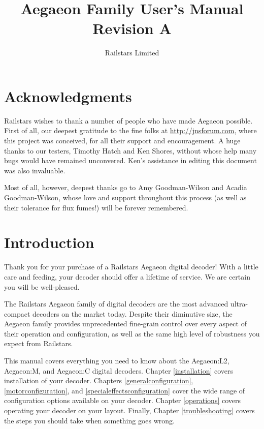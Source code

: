 \documentclass[12pt,letterpaper,draft]{memoir} %
\title{Aegaeon Family User's Manual\\Revision A}
\author{Railstars Limited}
\begin{document}
\maketitle
\newpage


\chapter*{Acknowledgments}

Railstars wishes to thank a number of people who have made Aegaeon possible. First of all, our deepest gratitude to the fine folks at \url{http://jnsforum.com}, where this project was conceived, for all their support and encouragement. A huge thanks to our testers, Timothy Hatch and Ken Shores, without whose help many bugs would have remained unconvered. Ken's assistance in editing this document was also invaluable.

Most of all, however, deepest thanks go to Amy Goodman-Wilson and Acadia Goodman-Wilson, whose love and support throughout this process (as well as their tolerance for flux fumes!) will be forever remembered.
\newpage


\tableofcontents* %


\pagestyle{manual}
\chapter{Introduction}

Thank you for your purchase of a Railstars Aegaeon digital decoder! With a little care and feeding, your decoder should offer a lifetime of service. We are certain you will be well-pleased.

The Railstars Aegaeon family of digital decoders are the most advanced ultra-compact decoders on the market today. Despite their diminutive size, the Aegaeon family provides unprecedented fine-grain control over every aspect of their operation and configuration, as well as the same high level of robustness you expect from Railstars.

This manual covers everything you need to know about the Aegaeon:L2, Aegaeon:M, and Aegaeon:C digital decoders. Chapter \ref{installation} covers installation of your decoder. Chapters \ref{generalconfiguration}, \ref{motorconfiguration}, and \ref{specialeffectsconfiguration} cover the wide range of configuration options available on your decoder. Chapter \ref{operations} covers operating your decoder on your layout. Finally, Chapter \ref{troubleshooting} covers the steps you should take when something goes wrong.
\end{document}
